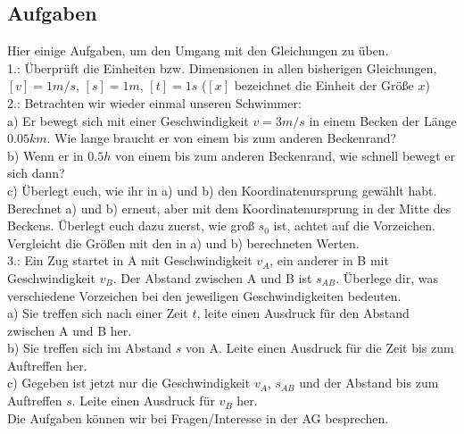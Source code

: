 \documentclass[11pt]{article}
\begin{document}
\subsection*{Aufgaben}
Hier einige Aufgaben, um den Umgang mit den Gleichungen zu üben. \\

1.: Überprüft die Einheiten bzw. Dimensionen in allen bisherigen Gleichungen, $[v] = 1 m/s$, $[s] = 1 m$, $[t] = 1s$ ($[x]$ bezeichnet die Einheit der Größe $x$) \\

2.: Betrachten wir wieder einmal unseren Schwimmer: \\
a) Er bewegt sich mit einer Geschwindigkeit $v = 3 m/s$ in einem Becken der Länge $0.05km$. Wie lange braucht er von einem bis zum anderen Beckenrand? \\
b) Wenn er in $0.5h$ von einem bis zum anderen Beckenrand, wie schnell bewegt er sich dann? \\
c) Überlegt euch, wie ihr in a) und b) den Koordinatenursprung gewählt habt. Berechnet a) und b) erneut, aber mit dem Koordinatenursprung in der Mitte des Beckens. Überlegt euch dazu zuerst, wie groß $s_0$ ist, achtet auf die Vorzeichen. Vergleicht die Größen mit den in a) und b) berechneten Werten. \\

3.: Ein Zug startet in A mit Geschwindigkeit $v_A$, ein anderer in B mit Geschwindigkeit $v_B$. Der Abstand zwischen A und B ist $s_{AB}$. Überlege dir, was verschiedene Vorzeichen bei den jeweiligen Geschwindigkeiten bedeuten. \\ 
a) Sie treffen sich nach einer Zeit $t$, leite einen Ausdruck für den Abstand zwischen A und B her. \\
b) Sie treffen sich im Abstand $s$ von A. Leite einen Ausdruck für die Zeit bis zum Auftreffen her. \\
c) Gegeben ist jetzt nur die Geschwindigkeit $v_A$, $s_{AB}$ und der Abstand bis zum Auftreffen $s$. Leite einen Ausdruck für $v_B$ her. \\

Die Aufgaben können wir bei Fragen/Interesse in der AG besprechen. 
\end{document}
